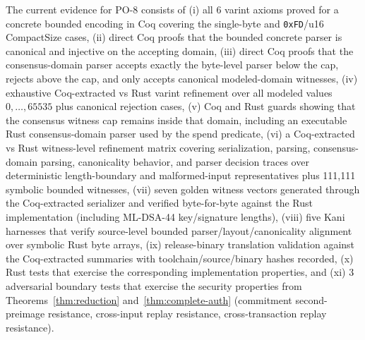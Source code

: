 \documentclass[11pt]{article}
\begin{document}
The current evidence for PO-8 consists of (i) all 6 varint axioms proved for a concrete bounded encoding in Coq covering the single-byte and \texttt{0xFD}/u16 CompactSize cases, (ii) direct Coq proofs that the bounded concrete parser is canonical and injective on the accepting domain, (iii) direct Coq proofs that the consensus-domain parser accepts exactly the byte-level parser below the cap, rejects above the cap, and only accepts canonical modeled-domain witnesses, (iv) exhaustive Coq-extracted vs Rust varint refinement over all modeled values $0,\ldots,65535$ plus canonical rejection cases, (v) Coq and Rust guards showing that the consensus witness cap remains inside that domain, including an executable Rust consensus-domain parser used by the spend predicate, (vi) a Coq-extracted vs Rust witness-level refinement matrix covering serialization, parsing, consensus-domain parsing, canonicality behavior, and parser decision traces over deterministic length-boundary and malformed-input representatives plus 111{,}111 symbolic bounded witnesses, (vii) seven golden witness vectors generated through the Coq-extracted serializer and verified byte-for-byte against the Rust implementation (including ML-DSA-44 key/signature lengths), (viii) five Kani harnesses that verify source-level bounded parser/layout/canonicality alignment over symbolic Rust byte arrays, (ix) release-binary translation validation against the Coq-extracted summaries with toolchain/source/binary hashes recorded, (x) Rust tests that exercise the corresponding implementation properties, and (xi) 3 adversarial boundary tests that exercise the security properties from Theorems~\ref{thm:reduction} and~\ref{thm:complete-auth} (commitment second-preimage resistance, cross-input replay resistance, cross-transaction replay resistance).
\end{document}

